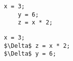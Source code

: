 
\noindent\begin{minipage}{.45\textwidth}
\begin{lstlisting}[style=CStyle, caption=Original source code., label=equivalent1]
	x = 3;
	y = 6;
	z = x * 2;
\end{lstlisting}
\end{minipage}\hfill
\begin{minipage}{.45\textwidth}
\begin{lstlisting}[style=CStyle, caption=Equivalent mutant., label=equivalent2, mathescape=true]
	 x = 3;
$\Delta$ z = x * 2;
$\Delta$ y = 6;
\end{lstlisting}
\end{minipage}